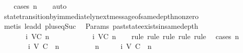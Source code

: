 \begin{isabellebody}
%
\isadelimproof
\ \ %
\endisadelimproof
%
\isatagproof
{}\isamarkupfalse%
\ {\isacharparenleft}cases\ n{\isacharparenright}\isanewline
\ \ \isamarkupfalse%
\ auto{\isacharbrackleft}{}{\isacharbrackright}\isanewline
\ \ \isamarkupfalse%
\ state{\isacharunderscore}transition{\isacharunderscore}by{\isacharunderscore}immediately{\isacharunderscore}next{\isacharunderscore}message{\isacharunderscore}of{\isacharunderscore}same{\isacharunderscore}depth{\isacharunderscore}non{\isacharunderscore}zero\isanewline
\ \ \isamarkupfalse%
\ {\isacharparenleft}metis\ le{\isacharunderscore}add{}\ plus{\isacharunderscore}{}{\isacharunderscore}eq{\isacharunderscore}Suc{\isacharparenright}%
\endisatagproof
{\isafoldproof}%
%
\isadelimproof
\isanewline
%
\endisadelimproof
\isanewline
{}\isamarkupfalse%
\ {\isacharparenleft}\ Params{\isacharparenright}\ past{\isacharunderscore}state{\isacharunderscore}exists{\isacharunderscore}in{\isacharunderscore}same{\isacharunderscore}depth\ {\isacharcolon}\isanewline
\ \ {\isachardoublequoteopen}{\isasymforall}\ {\isasymsigma}\ {\isasymsigma}{\isacharprime}{\isachardot}\ {\isasymsigma}{\isacharprime}\ {\isasymin}\ {\isasymSigma}i\ {\isacharparenleft}V{\isacharcomma}C{\isacharcomma}{\isasymepsilon}{\isacharparenright}\ n\ {\isasymlongrightarrow}\ {\isasymsigma}\ {\isasymsubseteq}\ {\isasymsigma}{\isacharprime}\ {\isasymlongrightarrow}\ {\isasymsigma}\ {\isasymin}\ {\isasymSigma}\ {\isasymlongrightarrow}\ {\isasymsigma}\ {\isasymin}\ {\isasymSigma}i\ {\isacharparenleft}V{\isacharcomma}C{\isacharcomma}{\isasymepsilon}{\isacharparenright}\ n{\isachardoublequoteclose}\isanewline
%
\isadelimproof
\ \ %
\endisadelimproof
%
\isatagproof
{}\isamarkupfalse%
\ {\isacharparenleft}rule{\isacharcomma}\ rule{\isacharcomma}\ rule{\isacharcomma}\ rule{\isacharcomma}\ rule{\isacharparenright}\ \isanewline
{}\isamarkupfalse%
\ {\isacharparenleft}cases\ n{\isacharparenright}\isanewline
\ \ \isamarkupfalse%
\ {}\isanewline
\ \ \isamarkupfalse%
\ {\isachardoublequoteopen}{\isasymAnd}{\isasymsigma}\ {\isasymsigma}{\isacharprime}{\isachardot}\ {\isasymsigma}{\isacharprime}\ {\isasymin}\ {\isasymSigma}i\ {\isacharparenleft}V{\isacharcomma}\ C{\isacharcomma}\ {\isasymepsilon}{\isacharparenright}\ n\ {\isasymLongrightarrow}\ {\isasymsigma}\ {\isasymsubseteq}\ {\isasymsigma}{\isacharprime}\ {\isasymLongrightarrow}\ {\isasymsigma}\ {\isasymin}\ {\isasymSigma}\ {\isasymLongrightarrow}\ n\ {\isacharequal}\ {}\ {\isasymLongrightarrow}\ {\isasymsigma}\ {\isasymin}\ {\isasymSigma}i\ {\isacharparenleft}V{\isacharcomma}\ C{\isacharcomma}\ {\isasymepsilon}{\isacharparenright}\ n{\isachardoublequoteclose}\isanewline

\end{isabellebody}
